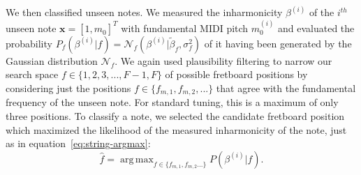 \documentclass[convention,peer-reviewed]{aesconf}
\DeclareMathOperator*{\argmax}{arg\,max}
\begin{document}
We then classified unseen notes. We measured the inharmonicity $\beta^{(i)}$ of the $i^{th}$ unseen note $\mathbf{x}=[1,m_0^{                                                                                                                                                                                                                                                                                                                                                                                                                                                                                                                                                                                                                                                                                                                                                                                                                                                                                                                                                                                                                                                                                                                                                                                                                                                                                                                                                                                                                                                                                                                                                                                                                                                                                                                                                                                                                                    }]^T$ with fundamental MIDI pitch $m_0^{(i)}$ and evaluated the probability $P_f(\beta^{(i)} | f) = \mathcal{N}_f(\beta^{(i)} | \tilde{\beta}_f,\sigma^2_f)$ of it having been generated by the Gaussian distribution $\mathcal{N}_f$. We again used plausibility filtering to narrow our search space $f \in \{1,2,3,...,F-1,F\}$ of possible fretboard positions by considering just the positions $f \in \{f_{m,1},f_{m,2},...\}$ that agree with the fundamental frequency of the unseen note. For standard 
tuning, this is a maximum of only three positions. To classify a note, we selected the candidate fretboard position which maximized the likelihood of the measured inharmonicity of the note, just as in equation~\eqref{eq:string-argmax}:
\begin{equation}
\hat{f} = \argmax_{f\in\{f_{m,1},f_{m,2}...\}}P(\beta^{(i)} | f).
\label{eq:string-classification-mle}
\end{equation}
\end{document}

